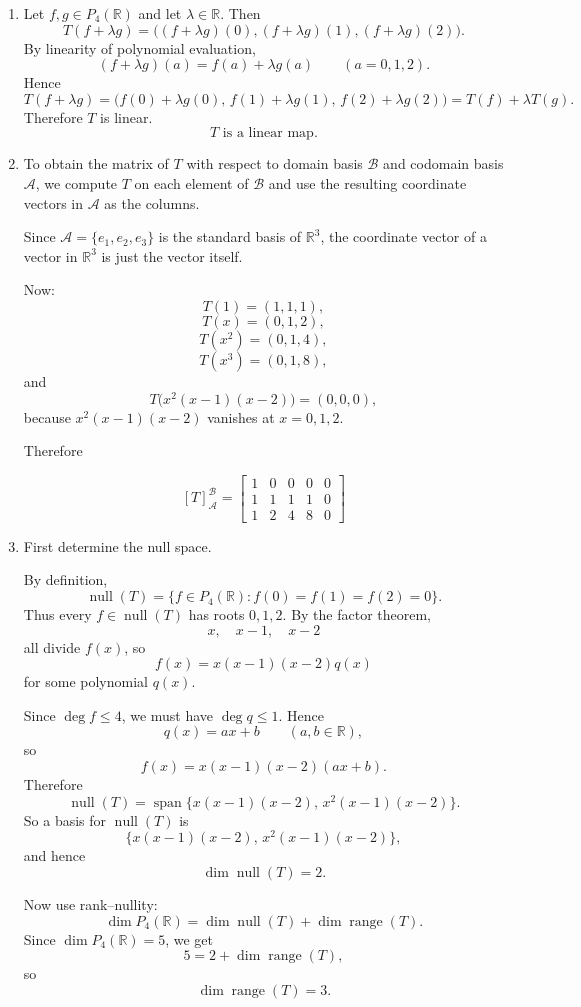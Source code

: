 \documentclass[12pt]{article}
\begin{document}
\begin{enumerate}[label=(\alph*)]
\item Let $f,g\in P_4(\mathbb{R})$ and let $\lambda\in\mathbb{R}$. Then
\[
T(f+\lambda g)
=
\big((f+\lambda g)(0),(f+\lambda g)(1),(f+\lambda g)(2)\big).
\]
By linearity of polynomial evaluation,
\[
(f+\lambda g)(a)=f(a)+\lambda g(a)\qquad (a=0,1,2).
\]
Hence
\[
T(f+\lambda g)
=
\big(f(0)+\lambda g(0),\,f(1)+\lambda g(1),\,f(2)+\lambda g(2)\big)
=
T(f)+\lambda T(g).
\]
Therefore $T$ is linear.
\[
\boxed{\,T\text{ is a linear map.}\,}
\]

\bigskip
\item To obtain the matrix of $T$ with respect to domain basis $\mathcal{B}$ and codomain basis $\mathcal{A}$, we compute $T$ on each element of $\mathcal{B}$ and use the resulting coordinate vectors in $\mathcal{A}$ as the columns.

Since $\mathcal{A}=\{e_1,e_2,e_3\}$ is the standard basis of $\mathbb{R}^3$, the coordinate vector of a vector in $\mathbb{R}^3$ is just the vector itself.

Now:
\[
T(1)=(1,1,1),
\]
\[
T(x)=(0,1,2),
\]
\[
T(x^2)=(0,1,4),
\]
\[
T(x^3)=(0,1,8),
\]
and
\[
T\big(x^2(x-1)(x-2)\big)=(0,0,0),
\]
because $x^2(x-1)(x-2)$ vanishes at $x=0,1,2$.

Therefore

\[
\boxed{
[T]_{\mathcal{A}}^{\mathcal{B}}
=
\begin{bmatrix}
1 & 0 & 0 & 0 & 0\\
1 & 1 & 1 & 1 & 0\\
1 & 2 & 4 & 8 & 0
\end{bmatrix}}
\]

\item First determine the null space.

By definition,
\[
\operatorname{null}(T)
=
\{f\in P_4(\mathbb{R}) : f(0)=f(1)=f(2)=0\}.
\]
Thus every $f\in\operatorname{null}(T)$ has roots $0,1,2$. By the factor theorem,
\[
x,\quad x-1,\quad x-2
\]
all divide $f(x)$, so
\[
f(x)=x(x-1)(x-2)q(x)
\]
for some polynomial $q(x)$.

Since $\deg f\le 4$, we must have $\deg q\le 1$. Hence
\[
q(x)=ax+b
\qquad (a,b\in\mathbb{R}),
\]
so
\[
f(x)=x(x-1)(x-2)(ax+b).
\]
Therefore
\[
\operatorname{null}(T)
=
\operatorname{span}\{x(x-1)(x-2),\,x^2(x-1)(x-2)\}.
\]
So a basis for $\operatorname{null}(T)$ is
\[
\{x(x-1)(x-2),\,x^2(x-1)(x-2)\},
\]
and hence
\[
\dim\operatorname{null}(T)=2.
\]

Now use rank--nullity:
\[
\dim P_4(\mathbb{R})=\dim\operatorname{null}(T)+\dim\operatorname{range}(T).
\]
Since $\dim P_4(\mathbb{R})=5$, we get
\[
5=2+\dim\operatorname{range}(T),
\]
so
\[
\dim\operatorname{range}(T)=3.
\]


\end{enumerate}
\end{document}
